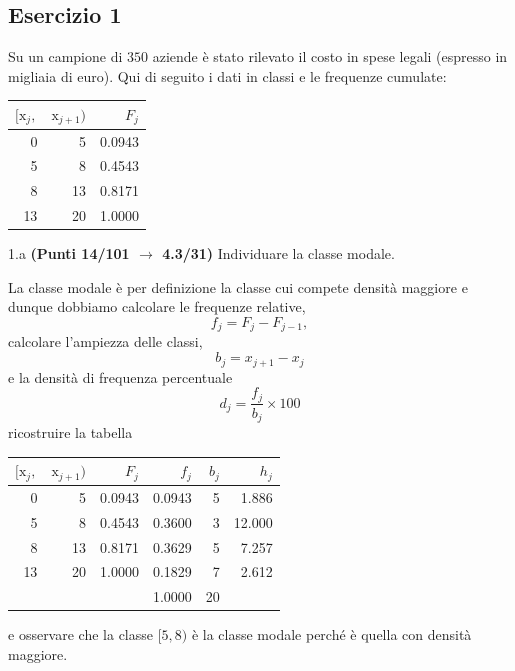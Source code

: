 \documentclass[
  11pt,
]{book}
\theoremstyle{mytheoremstyle}
\theoremstyle{mydefstyle}
\newenvironment{sol}
  {
  \begin{tcolorbox}[enhanced,breakable,arc=0.1mm,boxrule=1pt,colback=white,colframe=iblue,
  title=\bf \fontfamily{lmss}\selectfont \hspace{.5 cm} Soluzione,drop fuzzy shadow]

}{
\end{tcolorbox}
  }
\begin{document}
\subsection{Esercizio 1}\label{esercizio-1-6}

Su un campione di \(350\) aziende è stato rilevato il costo in spese legali (espresso in migliaia di euro). Qui di seguito i dati in classi e le frequenze cumulate:

\begin{table}[H]
\centering
\begin{tabular}{rrr}
\toprule
$[\text{x}_j,$ & $\text{x}_{j+1})$ & $F_j$\\
\midrule
0 & 5 & 0.0943\\
5 & 8 & 0.4543\\
8 & 13 & 0.8171\\
13 & 20 & 1.0000\\
\bottomrule
\end{tabular}
\end{table}

1.a \textbf{(Punti 14/101 \(\rightarrow\) 4.3/31)} Individuare la classe modale.

\begin{sol}

La classe modale è per definizione la classe cui compete densità maggiore e dunque dobbiamo calcolare
le frequenze relative,
\[
f_j=F_j-F_{j-1},
\]
calcolare l'ampiezza delle classi,
\[
b_j=x_{j+1}-x_{j}
\]
e la densità di frequenza percentuale
\[
d_j=\frac{f_j}{b_j}\times 100
\]
ricostruire la tabella

\begin{table}[H]
\centering
\begin{tabular}{rrrrrr}
\toprule
$[\text{x}_j,$ & $\text{x}_{j+1})$ & $F_j$ & $f_j$ & $b_j$ & $h_j$\\
\midrule
0 & 5 & 0.0943 & 0.0943 & 5 & 1.886\\
5 & 8 & 0.4543 & 0.3600 & 3 & 12.000\\
8 & 13 & 0.8171 & 0.3629 & 5 & 7.257\\
13 & 20 & 1.0000 & 0.1829 & 7 & 2.612\\
 &  &  & 1.0000 & 20 & \\
\bottomrule
\end{tabular}
\end{table}

e osservare che la classe \([5,8)\) è la classe modale perché è quella con densità maggiore.

\end{sol}
\end{document}
